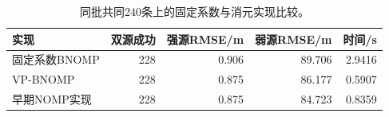 \begin{table}[pos=H]\centering\small
\caption{同批共同240条上的固定系数与消元实现比较。}\label{tab:profile}
\begin{tabular}{@{}lrrrr@{}}\toprule
实现 & 双源成功 & 强源RMSE/m & 弱源RMSE/m & 时间/s\\\midrule
固定系数BNOMP & 228 & 0.906 & 89.706 & 2.9416\\
VP-BNOMP & 228 & 0.875 & 86.177 & 0.5907\\
早期NOMP实现 & 228 & 0.875 & 84.723 & 0.8359\\
\bottomrule\end{tabular}\end{table}
